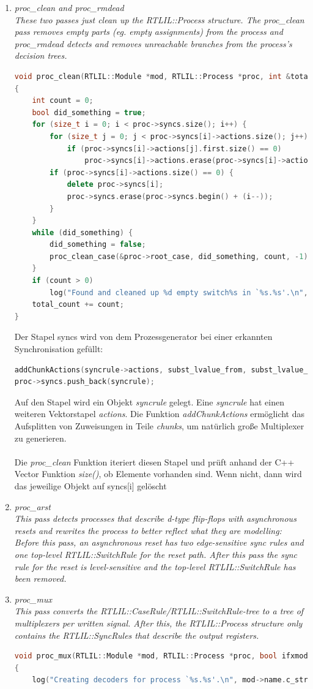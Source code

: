 \documentclass[11pt]{report}
\begin{document}
\begin{enumerate}
  \item \textit{proc\_clean and proc\_rmdead\\
These two passes just clean up the RTLIL::Process structure. The proc\_clean pass removes empty parts (eg. empty assignments) from the process and proc\_rmdead detects and removes unreachable branches from the process’s decision trees.}
\begin{lstlisting}[language=C++]
void proc_clean(RTLIL::Module *mod, RTLIL::Process *proc, int &total_count)
{
	int count = 0;
	bool did_something = true;
	for (size_t i = 0; i < proc->syncs.size(); i++) {
		for (size_t j = 0; j < proc->syncs[i]->actions.size(); j++)
			if (proc->syncs[i]->actions[j].first.size() == 0)
				proc->syncs[i]->actions.erase(proc->syncs[i]->actions.begin() + (j--));
		if (proc->syncs[i]->actions.size() == 0) {
			delete proc->syncs[i];
			proc->syncs.erase(proc->syncs.begin() + (i--));
		}
	}
	while (did_something) {
		did_something = false;
		proc_clean_case(&proc->root_case, did_something, count, -1);
	}
	if (count > 0)
		log("Found and cleaned up %d empty switch%s in `%s.%s'.\n", count, count == 1 ? "" : "es", mod->name.c_str(), proc->name.c_str());
	total_count += count;
}
\end{lstlisting}
Der Stapel syncs wird von dem Prozessgenerator bei einer erkannten Synchronisation gefüllt:
\begin{lstlisting}[language=C++]
addChunkActions(syncrule->actions, subst_lvalue_from, subst_lvalue_to, true);
proc->syncs.push_back(syncrule);
\end{lstlisting}
Auf den Stapel wird ein Objekt \textit{syncrule} gelegt. Eine \textit{syncrule} hat einen weiteren Vektorstapel \textit{actions}.
Die Funktion \textit{addChunkActions} ermöglicht das Aufsplitten von Zuweisungen  in Teile \textit{chunks}, um natürlich große Multiplexer zu generieren.
\\
\\
Die \textit{proc\_clean} Funktion iteriert diesen Stapel und prüft anhand der C++ Vector Funktion \textit{size()}, ob Elemente vorhanden sind. Wenn nicht, dann wird das jeweilige Objekt auf syncs[i] gelöscht
\item \textit{proc\_arst\\
This pass detects processes that describe d-type flip-flops with asynchronous resets and rewrites the process to better reflect what they are modelling: Before this pass, an asynchronous reset has two edge-sensitive sync rules and one top-level RTLIL::SwitchRule for the reset path. After this pass the sync rule for the reset is level-sensitive and the top-level RTLIL::SwitchRule has been removed.}
\item \textit{proc\_mux\\
This pass converts the RTLIL::CaseRule/RTLIL::SwitchRule-tree to a tree of multiplexers per written signal. After this, the RTLIL::Process structure only contains the RTLIL::SyncRules that describe the output registers.
}
\begin{lstlisting}[language=C++]
void proc_mux(RTLIL::Module *mod, RTLIL::Process *proc, bool ifxmode)
{
	log("Creating decoders for process `%s.%s'.\n", mod->name.c_str(), proc->name.c_str());


\end{lstlisting}
\end{enumerate}
\end{document}
